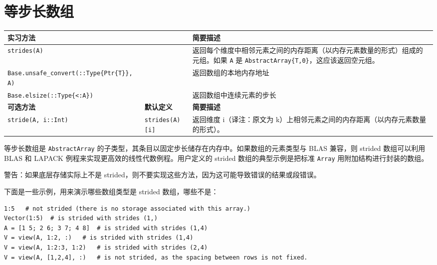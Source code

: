\section{等步长数组}




\begin{table}[h]

\begin{tabulary}{\linewidth}{|L|L|L|}
\hline
实习方法 &  & 简要描述 \\
\hline
\texttt{strides(A)} &  & 返回每个维度中相邻元素之间的内存距离（以内存元素数量的形式）组成的元组。如果 \texttt{A} 是 \texttt{AbstractArray\{T,0\}}，这应该返回空元组。 \\
\hline
\texttt{Base.unsafe\_convert(::Type\{Ptr\{T\}\}, A)} &  & 返回数组的本地内存地址 \\
\hline
\texttt{Base.elsize(::Type\{<:A\})} &  & 返回数组中连续元素的步长 \\
\hline
\textbf{可选方法} & \textbf{默认定义} & \textbf{简要描述} \\
\hline
\texttt{stride(A, i::Int)} & \texttt{strides(A)[i]} & 返回维度 i（译注：原文为 k）上相邻元素之间的内存距离（以内存元素数量的形式）。 \\
\hline
\end{tabulary}

\end{table}



等步长数组是 \texttt{AbstractArray} 的子类型，其条目以固定步长储存在内存中。如果数组的元素类型与 BLAS 兼容，则 strided 数组可以利用 BLAS 和 LAPACK 例程来实现更高效的线性代数例程。用户定义的 strided 数组的典型示例是把标准 \texttt{Array} 用附加结构进行封装的数组。



警告：如果底层存储实际上不是 strided，则不要实现这些方法，因为这可能导致错误的结果或段错误。



下面是一些示例，用来演示哪些数组类型是 strided 数组，哪些不是：




\begin{verbatim}
1:5   # not strided (there is no storage associated with this array.)
Vector(1:5)  # is strided with strides (1,)
A = [1 5; 2 6; 3 7; 4 8]  # is strided with strides (1,4)
V = view(A, 1:2, :)   # is strided with strides (1,4)
V = view(A, 1:2:3, 1:2)   # is strided with strides (2,4)
V = view(A, [1,2,4], :)   # is not strided, as the spacing between rows is not fixed.
\end{verbatim}



